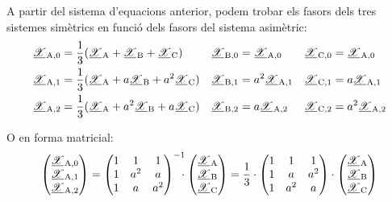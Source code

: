 A partir del sistema d'equacions anterior, podem trobar els fasors
dels tres sistemes simètrics en funció dels fasors del sistema
asimètric:
\begin{subequations}
\begin{align}
   \cmplx{\mathscr{X}}\ped{A,0} &= \frac{1}{3} (\cmplx{\mathscr{X}}\ped{A} + \cmplx{\mathscr{X}}\ped{B} +
   \cmplx{\mathscr{X}}\ped{C}) & \cmplx{\mathscr{X}}\ped{B,0} &= \cmplx{\mathscr{X}}\ped{A,0} &
   \cmplx{\mathscr{X}}\ped{C,0} &= \cmplx{\mathscr{X}}\ped{A,0}
   \label{eq:c_sim_c2}\\
   \cmplx{\mathscr{X}}\ped{A,1} &= \frac{1}{3} (\cmplx{\mathscr{X}}\ped{A} + a \cmplx{\mathscr{X}}\ped{B} +
   a^2 \cmplx{\mathscr{X}}\ped{C}) & \cmplx{\mathscr{X}}\ped{B,1} &= a^2 \cmplx{\mathscr{X}}\ped{A,1} &
   \cmplx{\mathscr{X}}\ped{C,1} &= a \cmplx{\mathscr{X}}\ped{A,1} \label{eq:c_sim_a2} \\
   \cmplx{\mathscr{X}}\ped{A,2} &= \frac{1}{3} (\cmplx{\mathscr{X}}\ped{A} + a^2 \cmplx{\mathscr{X}}\ped{B} +
   a \cmplx{\mathscr{X}}\ped{C}) & \cmplx{\mathscr{X}}\ped{B,2} &= a \cmplx{\mathscr{X}}\ped{A,2} &
   \cmplx{\mathscr{X}}\ped{C,2} &= a^2 \cmplx{\mathscr{X}}\ped{A,2} \label{eq:c_sim_b2}
\end{align}
\end{subequations}

O en forma matricial:
\begin{equation}\label{eq:c_sim_mat1}
   \begin{pmatrix}
     \cmplx{\mathscr{X}}\ped{A,0} \\
     \cmplx{\mathscr{X}}\ped{A,1} \\
     \cmplx{\mathscr{X}}\ped{A,2}
   \end{pmatrix} =
   \begin{pmatrix}
     1 & 1 & 1 \\
     1 & a^2 & a\\
     1 & a & a^2
   \end{pmatrix}^{-1} \hspace{-2mm}\cdot
   \begin{pmatrix}
     \cmplx{\mathscr{X}}\ped{A} \\
     \cmplx{\mathscr{X}}\ped{B} \\
     \cmplx{\mathscr{X}}\ped{C}
   \end{pmatrix} =  \frac{1}{3} \cdot
   \begin{pmatrix}
     1 & 1 & 1 \\
     1 & a & a^2 \\
     1 & a^2 & a
   \end{pmatrix} \cdot
   \begin{pmatrix}
     \cmplx{\mathscr{X}}\ped{A} \\
     \cmplx{\mathscr{X}}\ped{B} \\
     \cmplx{\mathscr{X}}\ped{C}
   \end{pmatrix}
\end{equation}

